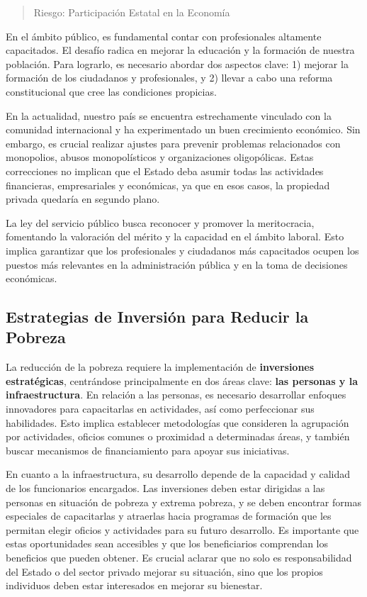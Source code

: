\documentclass[
  a4paper,
]{article}
\begin{document}
\begin{quote}
Riesgo: Participación Estatal en la Economía
\end{quote}

En el ámbito público, es fundamental contar con profesionales altamente
capacitados. El desafío radica en mejorar la educación y la formación de
nuestra población. Para lograrlo, es necesario abordar dos aspectos
clave: 1) mejorar la formación de los ciudadanos y profesionales, y 2)
llevar a cabo una reforma constitucional que cree las condiciones
propicias.

En la actualidad, nuestro país se encuentra estrechamente vinculado con
la comunidad internacional y ha experimentado un buen crecimiento
económico. Sin embargo, es crucial realizar ajustes para prevenir
problemas relacionados con monopolios, abusos monopolísticos y
organizaciones oligopólicas. Estas correcciones no implican que el
Estado deba asumir todas las actividades financieras, empresariales y
económicas, ya que en esos casos, la propiedad privada quedaría en
segundo plano.

La ley del servicio público busca reconocer y promover la meritocracia,
fomentando la valoración del mérito y la capacidad en el ámbito laboral.
Esto implica garantizar que los profesionales y ciudadanos más
capacitados ocupen los puestos más relevantes en la administración
pública y en la toma de decisiones económicas.

\subsection{Estrategias de Inversión para Reducir la
Pobreza}\label{estrategias-de-inversiuxf3n-para-reducir-la-pobreza}

La reducción de la pobreza requiere la implementación de
\textbf{inversiones estratégicas}, centrándose principalmente en dos
áreas clave: \textbf{las personas y la infraestructura}. En relación a
las personas, es necesario desarrollar enfoques innovadores para
capacitarlas en actividades, así como perfeccionar sus habilidades. Esto
implica establecer metodologías que consideren la agrupación por
actividades, oficios comunes o proximidad a determinadas áreas, y
también buscar mecanismos de financiamiento para apoyar sus iniciativas.

En cuanto a la infraestructura, su desarrollo depende de la capacidad y
calidad de los funcionarios encargados. Las inversiones deben estar
dirigidas a las personas en situación de pobreza y extrema pobreza, y se
deben encontrar formas especiales de capacitarlas y atraerlas hacia
programas de formación que les permitan elegir oficios y actividades
para su futuro desarrollo. Es importante que estas oportunidades sean
accesibles y que los beneficiarios comprendan los beneficios que pueden
obtener. Es crucial aclarar que no solo es responsabilidad del Estado o
del sector privado mejorar su situación, sino que los propios individuos
deben estar interesados en mejorar su bienestar.
\end{document}
